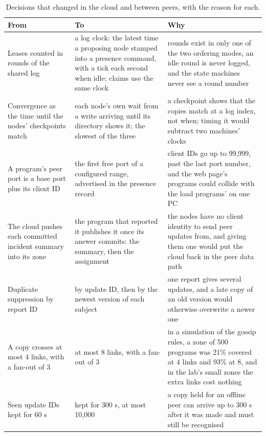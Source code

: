 \begin{table}[!htb]
\centering\small
\caption{Decisions that changed in the cloud and between peers, with the reason for each.}
\label{tab:changed}
\begin{tabularx}{\linewidth}{@{}P{3.9cm}P{4.1cm}L@{}}
\toprule
From & To & Why \\
\midrule
Leases counted in rounds of the shared log & a log clock: the latest time a proposing node stamped into a presence command, with a tick each second when idle; claims use the same clock & rounds exist in only one of the two ordering modes, an idle round is never logged, and the state machines never see a round number \\ %
Convergence as the time until the nodes' checkpoints match & each node's own wait from a write arriving until its directory shows it; the slowest of the three & a checkpoint shows that the copies match at a log index, not when; timing it would subtract two machines' clocks \\ %
A program's peer port is a base port plus its client ID & the first free port of a configured range, advertised in the presence record & client IDs go up to 99,999, past the last port number, and the web page's programs could collide with the load programs' on one PC \\ %
The cloud pushes each committed incident summary into its zone & the program that reported it publishes it once its answer commits: the summary, then the assignment & the nodes have no client identity to send peer updates from, and giving them one would put the cloud back in the peer data path \\ %
Duplicate suppression by report ID & by update ID, then by the newest version of each subject & one report gives several updates, and a late copy of an old version would otherwise overwrite a newer one \\ %
A copy crosses at most 4 links, with a fan-out of 3 & at most 8 links, with a fan-out of 3 & in a simulation of the gossip rules, a zone of 500 programs was 21\% covered at 4 links and 93\% at 8, and in the lab's small zones the extra links cost nothing \\ %
Seen update IDs kept for 60 s & kept for 300 s, at most 10,000 & a copy held for an offline peer can arrive up to 300 s after it was made and must still be recognised \\ %

\end{tabularx}
\end{table}
